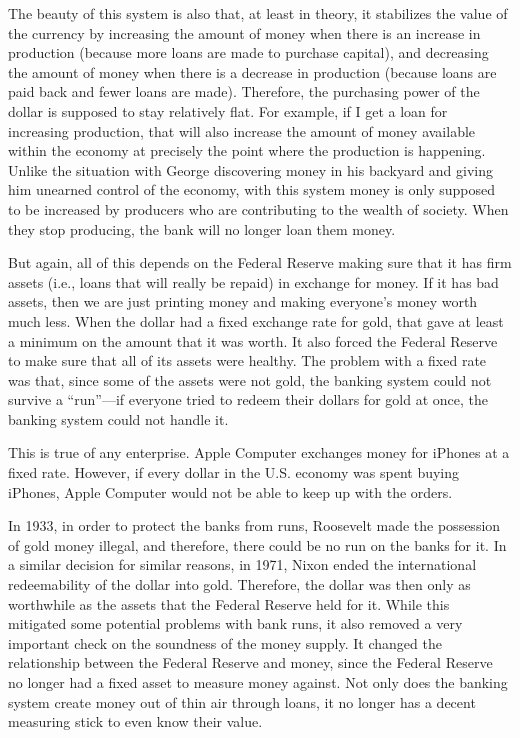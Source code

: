 The beauty of this system is also that, at least in theory, it stabilizes
the value of the currency by increasing the amount of money when there
is an increase in production (because more loans are made to purchase capital), and decreasing the amount of money when
there is a decrease in production (because loans are paid back and fewer loans are made). Therefore, the purchasing power of
the dollar is supposed to stay relatively flat.
For example, if I get
a loan for increasing production, that will also increase the amount of
money available within the economy at precisely the point where the
production is happening.  Unlike the situation with George discovering
money in his backyard and giving him unearned control of the economy, 
with this system money is only supposed to be increased by
producers who are contributing to the wealth of society.  When they 
stop producing, the bank will no longer loan them money.

But again, all of this depends on the Federal Reserve making sure that
it has firm assets (i.e., loans that will really be repaid) in exchange for money. 
If it has bad assets, then we
are just printing money and making everyone’s money worth much less.
When the dollar had a fixed exchange rate for gold, that gave at least
a minimum on the amount that it was worth. It also forced the Federal
Reserve to make sure that all of its assets were healthy. The problem
with a fixed rate was that, since some of the assets
were not gold, the banking system could not survive a ``run''---if everyone tried to redeem their dollars
for gold at once, the banking system
could not handle it.

This is true of any enterprise. Apple Computer exchanges money for
iPhones at a fixed rate. However, if every dollar in the U.S. economy
was spent buying iPhones, Apple Computer would not be able to keep up
with the orders.

In 1933, in order to protect the banks from runs, Roosevelt made the
possession of gold money illegal, and therefore, there could be no run
on the banks for it. In a similar decision for similar reasons, in
1971, Nixon ended the international redeemability of the dollar into
gold. Therefore, the dollar was then only as worthwhile as the assets
that the Federal Reserve held for it.  While this mitigated some potential
problems with bank runs, it also removed a very important check on 
the soundness of the money supply.  It changed the relationship between
the Federal Reserve and money, since the Federal Reserve no longer had a
fixed asset to measure money against.  Not only does the banking
system create money out of thin air through loans, it no longer
has a decent measuring stick to even know their value.

